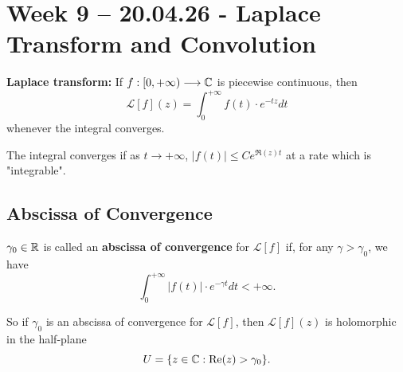 \section{Week 9 -- 20.04.26 - Laplace Transform and Convolution}

\begin{recall}
    \textbf{Laplace transform:} If $f: [0, +\infty) \longrightarrow \mathbb{C}$ is piecewise continuous, then
    \[
        \mathcal{L}[f](z) = \int_{0}^{+\infty} f(t) \cdot e^{-tz} dt
    \]
    whenever the integral converges.
\end{recall}

\begin{remark}
    The integral converges if as $t \to +\infty$, $|f(t)| \le C e^{\Re(z)t}$ at a rate which is "integrable".
\end{remark}
\subsection{Abscissa of Convergence}
\begin{definition}
    $\gamma_0 \in \mathbb{R}$ is called an \textbf{abscissa of convergence} for $\mathcal{L}[f]$ if, for any $\gamma > \gamma_0$, we have
    \[
        \int_{0}^{+\infty} |f(t)| \cdot e^{-\gamma t} dt < +\infty.
    \]
\end{definition}

So if $\gamma_0$ is an abscissa of convergence for $\mathcal{L}[f]$, then $\mathcal{L}[f](z)$ is holomorphic in the half-plane 
\[
    U = \{z \in \mathbb{C} : \operatorname{Re}(z) > \gamma_0\}.
\]

